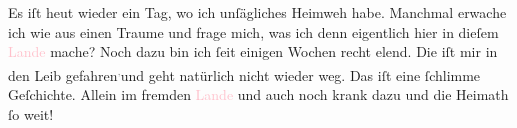 \pstart
           {\pb}Es iſt heut wieder
               ein Tag, wo ich unſägliches Heimweh habe. Manchmal erwache ich wie aus einen Traume
               und frage\strikeout{,} mich, was ich denn eigentlich hier in
               dieſem \textcolor{pink}{Lande}{}\ledrightnote{{$\rightarrow$}\textcolor{pink}{China}} mache? Noch dazu
               bin ich ſeit einigen Wochen recht elend. Die \label{K_L02858-3v}\label{K_L02858-3h} iſt mir in den
               Leib gefahren\substVorne{}\textsuperscript{\textcolor{gray}{,}}\substDazwischen{}und\substHinten{} geht natürlich nicht wieder weg. Das iſt eine ſchlimme Geſchichte. Allein im
               fremden \textcolor{pink}{Lande}{}\ledrightnote{{$\rightarrow$}\textcolor{pink}{China}} und auch noch
               krank dazu und die Heimath ſo weit! {\dotsfive}\pend
           
